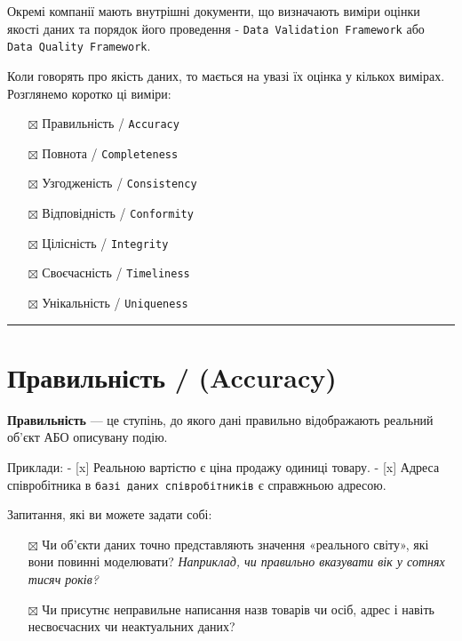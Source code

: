 \documentclass[
  letterpaper,
  DIV=11,
  numbers=noendperiod]{scrreprt}
\providecommand{\tightlist}{%
  \setlength{\itemsep}{0pt}\setlength{\parskip}{0pt}}\usepackage{longtable,booktabs,array}
\begin{document}
Окремі компанії мають внутрішні документи, що визначають виміри оцінки
якості даних та порядок його проведення -
\texttt{Data\ Validation\ Framework} або
\texttt{Data\ Quality\ Framework}.

Коли говорять про якість даних, то мається на увазі їх оцінка у кількох
вимірах. Розглянемо коротко ці виміри:

\begin{itemize}
\tightlist
\item[$\boxtimes$]
  Правильність / \texttt{Accuracy}
\item[$\boxtimes$]
  Повнота / \texttt{Completeness}
\item[$\boxtimes$]
  Узгодженість / \texttt{Consistency}
\item[$\boxtimes$]
  Відповідність / \texttt{Conformity}
\item[$\boxtimes$]
  Цілісність / \texttt{Integrity}
\item[$\boxtimes$]
  Своєчасність / \texttt{Timeliness}
\item[$\boxtimes$]
  Унікальність / \texttt{Uniqueness}
\end{itemize}

\begin{center}\rule{0.5\linewidth}{0.5pt}\end{center}

\section{Правильність /
(Accuracy)}\label{ux43fux440ux430ux432ux438ux43bux44cux43dux456ux441ux442ux44c-accuracy}

\textbf{Правильність} --- це ступінь, до якого дані правильно
відображають реальний об'єкт АБО описувану подію.

Приклади: - {[}x{]} Реальною вартістю є ціна продажу одиниці товару. -
{[}x{]} Адреса співробітника в \texttt{базі\ даних\ співробітників} є
справжньою адресою.

Запитання, які ви можете задати собі:

\begin{itemize}
\tightlist
\item[$\boxtimes$]
  Чи об'єкти даних точно представляють значення «реального світу», які
  вони повинні моделювати? \emph{Наприклад, чи правильно вказувати вік у
  сотнях тисяч років?}
\item[$\boxtimes$]
  Чи присутнє неправильне написання назв товарів чи осіб, адрес і навіть
  несвоєчасних чи неактуальних даних?
\end{itemize}
\end{document}
